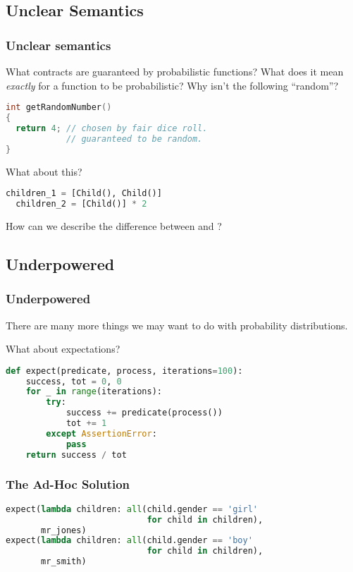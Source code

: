 \documentclass[usenames,dvipsnames]{beamer}
\begin{document}
\subsection{Unclear Semantics}
\begin{frame}[fragile]
  \frametitle{Unclear semantics}
  What contracts are guaranteed by probabilistic functions? What does it mean
  \emph{exactly} for a function to be probabilistic? Why isn't the
  following ``random''?
  \begin{lstlisting}[language=c]
int getRandomNumber()
{
  return 4; // chosen by fair dice roll.
            // guaranteed to be random.
}
  \end{lstlisting} 
\end{frame}
\begin{frame}[fragile]
  What about this?
  \begin{lstlisting}[language=Python]
  children_1 = [Child(), Child()]
  children_2 = [Child()] * 2
  \end{lstlisting}
  How can we describe the difference between  and
  ?
\end{frame}
\subsection{Underpowered}
\begin{frame}[fragile]
  \frametitle{Underpowered}
  There are many more things we may want to do with probability distributions.

  What about expectations?
  \begin{lstlisting}[language=Python]
def expect(predicate, process, iterations=100):
    success, tot = 0, 0
    for _ in range(iterations):
        try:
            success += predicate(process())
            tot += 1
        except AssertionError:
            pass
    return success / tot
  \end{lstlisting}
\end{frame}
\begin{frame}[fragile]
  \frametitle{The Ad-Hoc Solution}
  \begin{lstlisting}[language=Python]
expect(lambda children: all(child.gender == 'girl'
                            for child in children),
       mr_jones)
expect(lambda children: all(child.gender == 'boy'
                            for child in children),
       mr_smith)
  \end{lstlisting}
\end{frame}
\end{document}
